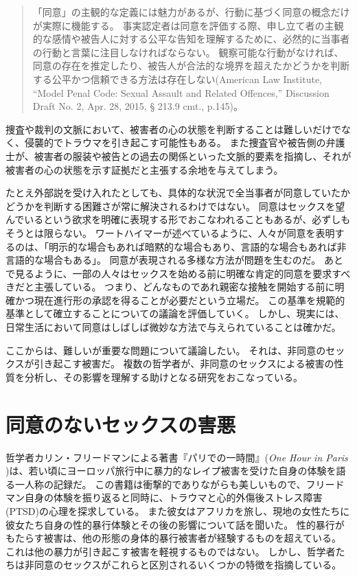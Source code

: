 \documentclass[paper=a4,book,openany]{jlreq} \usepackage{mystyle}
\begin{document}
\begin{quote}
「同意」の主観的な定義には魅力があるが、行動に基づく同意の概念だけが実際に機能する。
事実認定者は同意を評価する際、申し立て者の主観的な感情や被告人に対する公平な告知を理解するために、必然的に当事者の行動と言葉に注目しなければならない。
観察可能な行動がなければ、同意の存在を推定したり、被告人が合法的な境界を超えたかどうかを判断する公平かつ信頼できる方法は存在しない(American Law  Institute, ``Model Penal Code: Sexual Assault and Related Offences,'' Discussion Draft No. 2, Apr. 28, 2015, § 213.9 cmt., p.145)。
\end{quote}

捜査や裁判の文脈において、被害者の心の状態を判断することは難しいだけでなく、侵襲的でトラウマを引き起こす可能性もある。
また捜査官や被告側の弁護士が、被害者の服装や被告との過去の関係といった文脈的要素を指摘し、それが被害者の心の状態を示す証拠だと主張する余地を与えてしまう。

たとえ外部説を受け入れたとしても、具体的な状況で全当事者が同意していたかどうかを判断する困難さが常に解決されるわけではない。
同意はセックスを望んでいるという欲求を明確に表現する形でおこなわれることもあるが、必ずしもそうとは限らない。
ワートハイマーが述べているように、人々が同意を表明するのは、「明示的な場合もあれば暗黙的な場合もあり、言語的な場合もあれば非言語的な場合もある」\citep[p.346]{wertheimer03:_consen_sexual_relat}。
同意が表現される多様な方法が問題を生むのだ。
あとで見るように、一部の人々はセックスを始める前に明確な肯定的同意を要求すべきだと主張している。
つまり、どんなものであれ親密な接触を開始する前に明確かつ現在進行形の承認を得ることが必要だという立場だ。
この基準を規範的基準として確立することについての議論を評価していく。
しかし、現実には、日常生活において同意はしばしば微妙な方法で与えられていることは確かだ。

ここからは、難しいが重要な問題について議論したい。
それは、非同意のセックスが引き起こす被害だ。
複数の哲学者が、非同意のセックスによる被害の性質を分析し、その影響を理解する助けとなる研究をおこなっている。

\section{同意のないセックスの害悪}

哲学者カリン・フリードマンによる著書『パリでの一時間』(\emph{One Hour in Paris} \citep{freedman14:_one_hour_paris})は、若い頃にヨーロッパ旅行中に暴力的なレイプ被害を受けた自身の体験を語る一人称の記録だ。
この書籍は衝撃的でありながらも美しいもので、フリードマン自身の体験を振り返ると同時に、トラウマと心的外傷後ストレス障害(PTSD)の心理を探求している。
また彼女はアフリカを旅し、現地の女性たちに彼女たち自身の性的暴行体験とその後の影響について話を聞いた。
性的暴行がもたらす被害は、他の形態の身体的暴行被害者が経験するものを超えている。
これは他の暴力が引き起こす被害を軽視するものではない。
しかし、哲学者たちは非同意のセックスがこれらと区別されるいくつかの特徴を指摘している。
\end{document}
